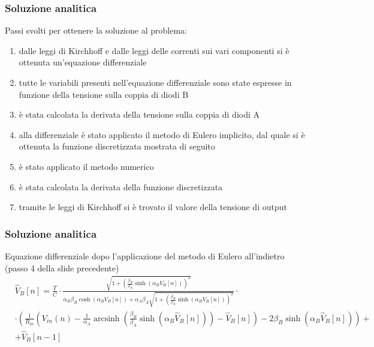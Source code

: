 \documentclass[11pt, t, aspectratio=169]{beamer}
\DeclareMathOperator{\arcsinh}{arcsinh}
\begin{document}
	\begin{frame}
		\frametitle{Soluzione analitica}
		
		Passi svolti per ottenere la soluzione al problema:
		\begin{enumerate}
			\item dalle leggi di Kirchhoff e dalle leggi delle correnti sui vari componenti si è ottenuta un'equazione differenziale
			\item tutte le variabili presenti nell'equazione differenziale sono state espresse in funzione della tensione sulla coppia di diodi B
			\item è stata calcolata la derivata della tensione sulla coppia di diodi A
			\item alla differenziale è stato applicato il metodo di Eulero implicito, dal quale si è ottenuta la funzione discretizzata mostrata di seguito
			\item è stato applicato il metodo numerico
			\item è stata calcolata la derivata della funzione discretizzata
			\item tramite le leggi di Kirchhoff si è trovato il valore della tensione di output
		\end{enumerate}
	\end{frame}
	
	\begin{frame}
		\frametitle{Soluzione analitica}
		
		Equazione differenziale dopo l'applicazione del metodo di Eulero all'indietro (passo 4 della slide precedente)
		\begin{equation}
			\begin{split}
				&\widehat V_{B}[n] = \frac{T}{C}\cdot\frac{\sqrt{1+\left(\frac{\beta_{B}}{\beta_{A}}\sinh(\alpha_{B}V_{B}[n])\right)^{2}}}{\alpha_{B}\beta_{B}\cosh(\alpha_{B}V_{B}[n])+\alpha_{A}\beta_{A}\sqrt{1+\left(\frac{\beta_{B}}{\beta_{A}}\sinh(\alpha_{B}V_{B}[n])\right)^{2}}}\cdot\\&\cdot\left(\frac{1}{R_{in}}\left(V_{in}(n)-\frac{1}{\alpha_{A}} \arcsinh \left(\frac{\beta_{B}}{\beta_{A}} \sinh(\alpha_{B}\widehat V_{B}[n])\right)-\widehat V_{B}[n]\right)-2\beta_{B}\sinh(\alpha_{B}\widehat V_{B}[n])\right)+\\&+\widehat V_{B}[n-1]\\
			\end{split}
		\end{equation}
	\end{frame}
	
\end{document}
